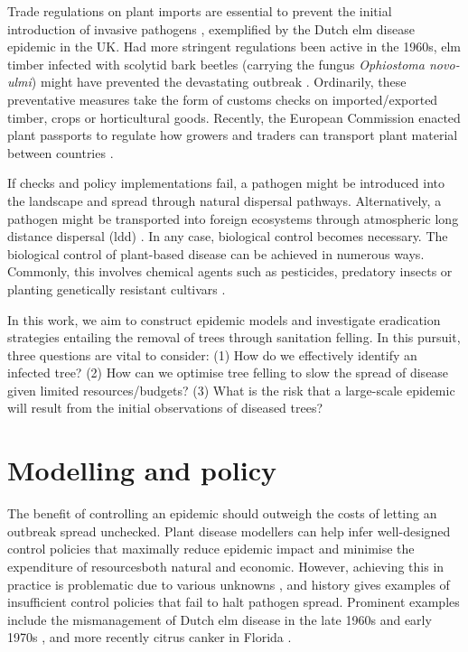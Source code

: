 Trade regulations on plant imports are essential to prevent the initial introduction of invasive pathogens \cite{rodoni2009role}, exemplified by the Dutch elm disease epidemic in the UK. 
Had more stringent regulations been active in the 1960s, elm timber infected with scolytid bark beetles (carrying the fungus \textit{Ophiostoma novo‐ulmi}) might have prevented the devastating outbreak \cite{doi:10.1111/j.1365-3059.2010.02391.x}. 
Ordinarily, these preventative measures take the form of customs checks on imported/exported timber, crops or horticultural goods. 
Recently, the European Commission enacted plant passports to regulate how growers and traders can transport plant material between countries \cite{wulfert2010implementation}.

If checks and policy implementations fail, a pathogen might be introduced into the landscape and spread through natural
dispersal pathways. Alternatively, a pathogen might be transported into foreign ecosystems through atmospheric 
long distance dispersal (\acrshort{ldd}) \cite{brown2002aerial}. In any case, biological control becomes necessary. 
The biological control of plant-based disease
can be achieved in numerous ways. Commonly, this involves chemical agents such as pesticides, predatory insects or planting
genetically resistant cultivars \cite{pal2006biological, baker1974biological}. 

In this work, we aim to construct epidemic models and investigate eradication strategies
entailing the removal of trees through sanitation felling. 
In this pursuit, three questions are vital to consider: 
(1) How do we effectively identify an infected tree? 
(2) How can we optimise tree felling to slow the spread of disease given limited resources/budgets?
(3) What is the risk that a large-scale epidemic will result from the initial observations of diseased trees?

\section{Modelling and policy}
\label{sec:modelling-and-policy}

The benefit of controlling an epidemic should outweigh the costs of letting an outbreak spread unchecked. 
Plant disease modellers can help infer well-designed control policies that maximally reduce epidemic impact and minimise the expenditure
of resources\textemdash both natural and economic. However, achieving this in practice is problematic due to various unknowns \cite{13-challenges}, and history gives examples of insufficient control policies that fail to halt pathogen spread. 
Prominent examples include the mismanagement of Dutch elm disease in the late 1960s and early 1970s \cite{dutch-elm-mismanage}, and more recently citrus canker in Florida \cite{schubert2001meeting}.

